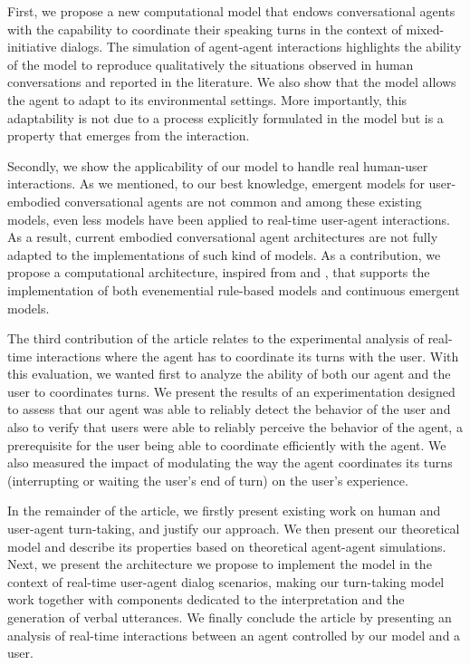 First, we propose a new computational model that endows conversational agents with the capability to coordinate their speaking turns in the context of mixed-initiative dialogs. The simulation of agent-agent interactions highlights the ability of the model to reproduce qualitatively the situations observed in human conversations and reported in the literature. 
We also show that the model allows the agent to adapt to its environmental settings.
More importantly, this adaptability is not due to a process explicitly formulated in the model but is a property that emerges from the interaction. 

Secondly, we show the applicability of our model to handle real human-user interactions. As we mentioned, to our best knowledge, emergent models for user-embodied conversational agents are not common and among these existing models, even less models have been applied to real-time user-agent interactions. As a result, current embodied conversational agent architectures are not fully adapted to the implementations of such kind of models. 
As a contribution, we propose a computational architecture, inspired from \cite{kopp_architecture_2014} and \cite{thorisson_mind_1999}, that supports the implementation of both evenemential rule-based models and continuous emergent models. 

The third contribution of the article relates to the experimental analysis of real-time interactions where the agent has to coordinate its turns with the user. With this evaluation, we wanted first to analyze the ability of both our agent and the user to coordinates turns. 
We present the results of an experimentation designed to assess 
that our agent was able to reliably detect the behavior of the user and also to verify that users were able to reliably perceive the behavior of the agent, a prerequisite for the user being able to coordinate efficiently with the agent. We also measured the impact of modulating the way the agent coordinates its turns (interrupting or waiting the user's end of turn) on the user's experience. 

In the remainder of the article, we firstly present existing work on human and user-agent turn-taking, and justify our approach. We then present our theoretical model and describe its properties based on theoretical agent-agent simulations.  Next, we present the architecture we propose to implement the model in the context of real-time user-agent dialog scenarios, making our turn-taking model work together with components dedicated to the interpretation and the generation of verbal utterances. We finally conclude the article by presenting an analysis of real-time interactions between an agent controlled by our model and a user. 


